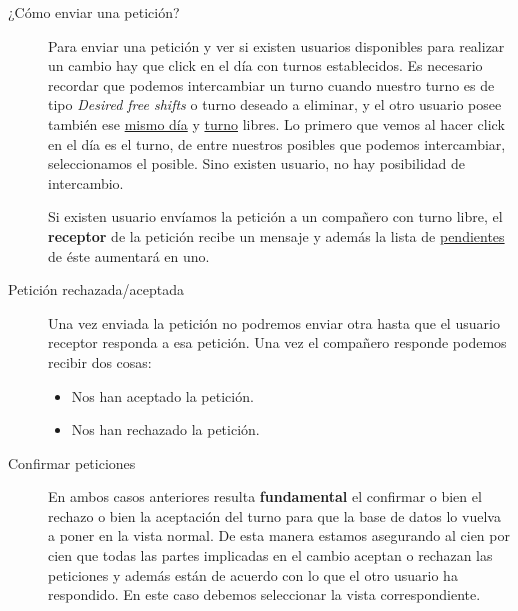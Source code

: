 \begin{description}

\item[¿Cómo enviar una petición?] Para enviar una petición y ver si existen usuarios disponibles para realizar un cambio hay que click en el día con turnos establecidos. Es necesario recordar que podemos intercambiar un turno cuando nuestro turno es de tipo \emph{Desired free shifts} o turno deseado a eliminar, y el otro usuario posee también ese \underline{mismo día} y \underline{turno} libres. Lo primero que vemos al hacer click en el día es el turno, de entre nuestros posibles que podemos intercambiar, seleccionamos el posible. Sino existen usuario, no hay posibilidad de intercambio.



Si existen usuario envíamos la petición a un compañero con turno libre, el \textbf{receptor} de la petición recibe un mensaje y además la lista de \underline{pendientes} de éste aumentará en uno. 



\item[Petición rechazada/aceptada] Una vez enviada la petición no podremos enviar otra hasta que el usuario receptor responda a esa petición. Una vez el compañero responde podemos recibir dos cosas:

\begin{itemize}
\item Nos han aceptado la petición. 
\item Nos han rechazado la petición. 
 
\end{itemize}


\item[Confirmar peticiones]
En ambos casos anteriores resulta \textbf{fundamental} el confirmar o bien el rechazo o bien la aceptación del turno para que la base de datos lo vuelva a poner en la vista normal. De esta manera estamos asegurando al cien por cien que todas las partes implicadas en el cambio aceptan o rechazan las peticiones y además están de acuerdo con lo que el otro usuario ha respondido. En este caso debemos seleccionar la vista correspondiente.

\end{description}

